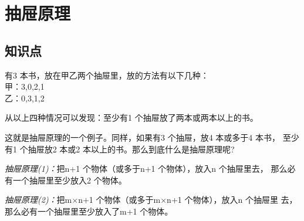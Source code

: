 \chapter{抽屉原理}
\section{知识点}
有3 本书，放在甲乙两个抽屉里，放的方法有以下几种：\\
甲：3,0,2,1\\
乙：0,3,1,2\par
从以上四种情况可以发现：至少有1 个抽屉放了两本或两本以上的书。\par
这就是抽屉原理的一个例子。同样，如果有3 个抽屉，放4 本或多于4 本书，
至少有1 个抽屉放2 本或2 本以上的书。那么到底什么是抽屉原理呢?
\par
\emph{抽屉原理(1)：}把n+1 个物体（或多于n+1 个物体），放入n 个抽屉里去，
那么必有一个抽屉里至少放入2 个物体。\par
\emph{抽屉原理(2)：}把m$\times$n+1 个物体（或多于m$\times$n+1 个物体），放入n 个抽屉里
去，那么必有一个抽屉里至少放入了m+1 个物体。

